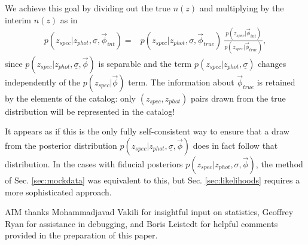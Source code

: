 \documentclass[iop]{emulateapj}
\newcommand{\textul}{\underline}
\begin{document}
We achieve this goal by dividing out the true $n(z)$ and multiplying by the 
interim $n(z)$ as in
\begin{align}
\label{eq:transformation}
p(z_{spec} | z_{phot}, \textul{\sigma}, \vec{\phi}_{int}) =& p(z_{spec} | 
z_{phot}, \textul{\sigma}, \vec{\phi}_{true})\ \frac{p(z_{spec} | 
\vec{\phi}_{int})}{p(z_{spec} | \vec{\phi}_{true})},
\end{align}
since $p(z_{spec} | z_{phot}, \textul{\sigma}, \vec{\phi})$ is separable and 
the term $p(z_{spec} | z_{phot}, \textul{\sigma})$ changes independently of the 
$p(z_{spec} | \vec{\phi})$ term.  The information about $\vec{\phi}_{true}$ is 
retained by the elements of the catalog: only $(z_{spec}, z_{phot})$ pairs 
drawn from the true distribution will be represented in the catalog!

It appears as if this is the only fully self-consistent way to ensure that a 
draw from the posterior distribution $p(z_{spec} | z_{phot}, \textul{\sigma}, 
\vec{\phi})$ does in fact follow that distribution.  In the cases with fiducial 
posteriors $p(z_{spec} | z_{phot}, \sigma, \vec{\phi})$, the method of Sec. 
\ref{sec:mockdata} was equivalent to this, but Sec. \ref{sec:likelihoods} 
requires a more sophisticated approach.

\begin{acknowledgements}
AIM thanks Mohammadjavad Vakili for insightful input on statistics, Geoffrey 
Ryan for assistance in debugging, and Boris Leistedt for helpful comments 
provided in the preparation of this paper.
\end{acknowledgements}
\end{document}
